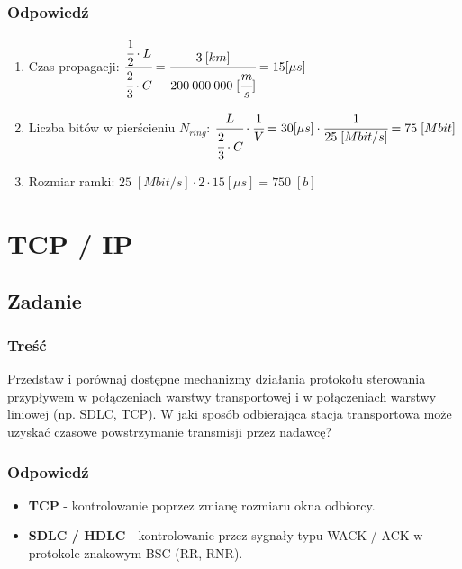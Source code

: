 		\subsubsection{Odpowiedź}
		\begin{enumerate}
			\item Czas propagacji: $ \cfrac{\cfrac{1}{2}\cdot L}{\cfrac{2}{3}\cdot C} = \cfrac{3\:[km]}{200\:000\:000\;[\cfrac{m}{s}]}=15 [\mu s]$
			\item Liczba bitów w pierścieniu $ N_{ring} $: $ \cfrac{L}{\cfrac{2}{3}\cdot C}\cdot \cfrac{1}{V} = 30 [\mu s] \cdot \cfrac{1}{25\;[Mbit/s]}=75\;[Mbit] $
			\item Rozmiar ramki: $ 25\;[Mbit/s]\cdot 2 \cdot 15 [\mu s]=750\;[b] $
		\end{enumerate}

\section{TCP / IP}
\subsection{Zadanie}
	\subsubsection{Treść}
		Przedstaw i porównaj dostępne mechanizmy działania protokołu sterowania przypływem w połączeniach warstwy transportowej i w połączeniach warstwy liniowej (np. SDLC, TCP). W jaki sposób odbierająca stacja transportowa może uzyskać czasowe powstrzymanie transmisji przez nadawcę?
	\subsubsection{Odpowiedź}
		\begin{itemize}
			\item \textbf{TCP} - kontrolowanie poprzez zmianę rozmiaru okna odbiorcy.
			\item \textbf{SDLC / HDLC} - kontrolowanie przez sygnały typu WACK / ACK w protokole znakowym BSC (RR, RNR).
		\end{itemize}
		


